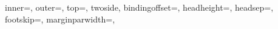 {{   %
   inner=\myinner,  %
   outer=\myouter, %
   top=\mytop,
   twoside,       %
   bindingoffset=\mybindingoffset,
   headheight=\myheadheight,
   headsep=\myheadsep,
   footskip=\myfootskip,
   marginparwidth=\mymarginparwidth, %
}}
